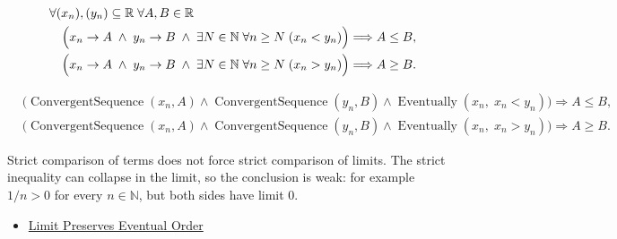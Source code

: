 \begin{remark*}
\[
\begin{aligned}
&\forall (x_n),(y_n)\subseteq\mathbb{R}\;\forall A,B\in\mathbb{R}\\
&\quad\Bigl(
  x_n\to A
  \;\land\;
  y_n\to B
  \;\land\;
  \exists N\in\mathbb{N}\;\forall n\ge N\;(x_n<y_n)
\Bigr)
\Longrightarrow A\le B,\\
&\quad\Bigl(
  x_n\to A
  \;\land\;
  y_n\to B
  \;\land\;
  \exists N\in\mathbb{N}\;\forall n\ge N\;(x_n>y_n)
\Bigr)
\Longrightarrow A\ge B.
\end{aligned}
\]
\end{remark*}

\begin{remark*}
\[
\begin{aligned}
&\bigl(
\operatorname{ConvergentSequence}(x_n,A)
\land
\operatorname{ConvergentSequence}(y_n,B)
\land
\operatorname{Eventually}(x_n,\;x_n<y_n)
\bigr)
\Longrightarrow A\le B,\\
&\bigl(
\operatorname{ConvergentSequence}(x_n,A)
\land
\operatorname{ConvergentSequence}(y_n,B)
\land
\operatorname{Eventually}(x_n,\;x_n>y_n)
\bigr)
\Longrightarrow A\ge B.
\end{aligned}
\]
\end{remark*}

\begin{remark*}[Interpretation]
Strict comparison of terms does not force strict comparison of limits. The
strict inequality can collapse in the limit, so the conclusion is weak:
for example $1/n>0$ for every $n\in\mathbb{N}$, but both sides have limit
$0$.
\end{remark*}

\begin{dependencies}
\begin{itemize}
  \item \hyperref[thm:limit-preserves-eventual-order]{Limit Preserves Eventual Order}
\end{itemize}
\end{dependencies}


